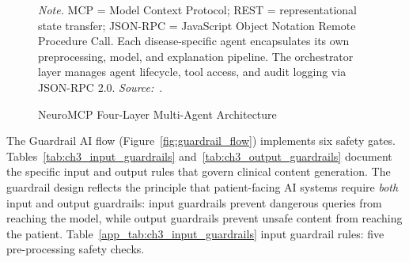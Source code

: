 \begin{figure}[!htbp]
{%
}
\caption{NeuroMCP Four-Layer Multi-Agent Architecture}
\label{app_fig:neuromcp_layers}
\vspace{0.5em}\noindent\textit{Note.} MCP = Model Context Protocol; REST = representational state transfer; JSON-RPC = JavaScript Object Notation Remote Procedure Call. Each disease-specific agent encapsulates its own preprocessing, model, and explanation pipeline. The orchestrator layer manages agent lifecycle, tool access, and audit logging via JSON-RPC 2.0. \textit{Source:}~\cite{asthana2025eegmaster}.
\end{figure}

\label{app_sec:guardrail_rules}

The Guardrail AI flow (Figure~\ref{fig:guardrail_flow}) implements six safety gates. Tables~\ref{tab:ch3_input_guardrails} and~\ref{tab:ch3_output_guardrails} document the specific input and output rules that govern clinical content generation. The guardrail design reflects the principle that patient-facing AI systems require \textit{both} input and output guardrails: input guardrails prevent dangerous queries from reaching the model, while output guardrails prevent unsafe content from reaching the patient.
\noindent Table~\ref{app_tab:ch3_input_guardrails} input guardrail rules: five pre-processing safety checks.

